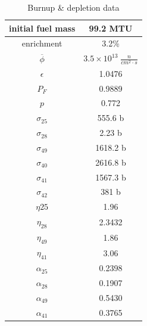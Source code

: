 \documentclass[11pt,a4paper]{article}
\begin{document}
\begin{longtable}{|c|c|}
    \caption{Burnup \& depletion data}
    \label{tab-data}
    \\
    \hline
    initial fuel mass
    & 99.2 MTU
    \\
    \hline
    enrichment
    & 3.2\%
    \\
    \hline
    $\overline{\phi}$
    &$3.5 \times 10^{13} \; \frac{n}{cm^2 \cdot s}$
    \\
    \hline
    $\epsilon$
    &1.0476
    \\
    \hline
    $P_{F}$ 
    &0.9889
    \\
    \hline
    $p$
    &0.772
    \\
    \hline
    $\sigma_{25}$
    &555.6 b
    \\
    \hline
    $\sigma_{28}$
    &2.23 b
    \\
    \hline
    $\sigma_{49}$
    &1618.2 b
    \\
    \hline
    $\sigma_{40}$
    &2616.8 b
    \\
    \hline
    $\sigma_{41}$
    &1567.3 b
    \\
    \hline
    $\sigma_{42}$
    &381 b
    \\
    \hline
    $\eta{25}$
    &1.96
    \\
    \hline
    $\eta_{28}$
    &2.3432
    \\
    \hline
    $\eta_{49}$
    &1.86
    \\
    \hline
    $\eta_{41}$
    &3.06
    \\
    \hline
    $\alpha_{25}$
    &0.2398
    \\
    \hline
    $\alpha_{28}$
    &0.1907
    \\
    \hline
    $\alpha_{49}$
    &0.5430
    \\
    \hline
    $\alpha_{41}$
    &0.3765
    \\
    \hline
\end{longtable}
\end{document}
